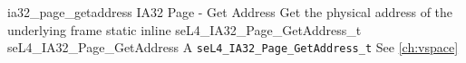 %
%
%
%

\apidoc
{ia32_page_getaddress}
{IA32 Page - Get Address}
{Get the physical address of the underlying frame}
{static inline seL4\_IA32\_Page\_GetAddress\_t seL4\_IA32\_Page\_GetAddress}
{
}
{A \texttt{seL4\_IA32\_Page\_GetAddress\_t} \pagegetaddresstdesc}
{See \autoref{ch:vspace}}
